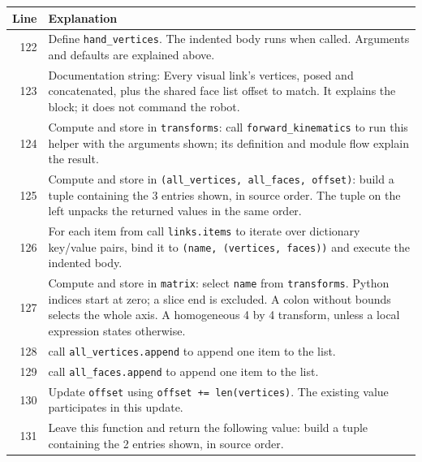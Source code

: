 \documentclass[11pt,a4paper]{book}
\begin{document}
\begin{longtable}{r p{}}

\textbf{Line} & \textbf{Explanation} \\ \hline \endhead

122 & Define \texttt{hand\_vertices}. The indented body runs when called. Arguments and defaults are explained above. \\

123 & Documentation string: Every visual link's vertices, posed and concatenated, plus the shared face list offset to match. It explains the block; it does not command the robot. \\

124 & Compute and store in \texttt{transforms}: call \texttt{forward\_kinematics} to run this helper with the arguments shown; its definition and module flow explain the result.  \\

125 & Compute and store in \texttt{(all\_vertices, all\_faces, offset)}: build a tuple containing the 3 entries shown, in source order. The tuple on the left unpacks the returned values in the same order. \\

126 & For each item from call \texttt{links.items} to iterate over dictionary key/value pairs, bind it to \texttt{(name, (vertices, faces))} and execute the indented body. \\

127 & Compute and store in \texttt{matrix}: select \texttt{name} from \texttt{transforms}. Python indices start at zero; a slice end is excluded. A colon without bounds selects the whole axis. A homogeneous 4 by 4 transform, unless a local expression states otherwise. \\

128 & call \texttt{all\_vertices.append} to append one item to the list. \\

129 & call \texttt{all\_faces.append} to append one item to the list. \\

130 & Update \texttt{offset} using \texttt{offset += len(vertices)}. The existing value participates in this update. \\

131 & Leave this function and return the following value: build a tuple containing the 2 entries shown, in source order. \\

\end{longtable}
\end{document}
